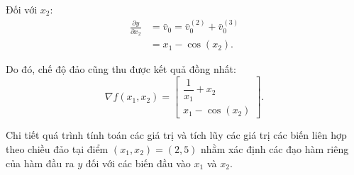 Đối với $x_2$:
\begin{equation}
\begin{aligned}
    \frac{\partial y}{\partial x_2} &= \bar{v}_0 = \bar{v}_0^{(2)} + \bar{v}_0^{(3)} \\
    &= x_1 - \cos(x_2).
\end{aligned}
\end{equation}

Do đó, chế độ đảo cũng thu được kết quả đồng nhất:
\begin{equation}
    \nabla f(x_1,x_2) = 
    \begin{bmatrix}
        \dfrac{1}{x_1} + x_2 \\[6pt]
        x_1 - \cos(x_2)
    \end{bmatrix}.
    \label{eq:reverse_gradient}
\end{equation}

Chi tiết quá trình tính toán các giá trị và tích lũy các giá trị các biến liên hợp theo chiều đảo tại điểm $(x_1,x_2) = (2,5)$ nhằm xác định các đạo hàm riêng của hàm đầu ra $y$ đối với các biến đầu vào $x_1$ và $x_2$.

